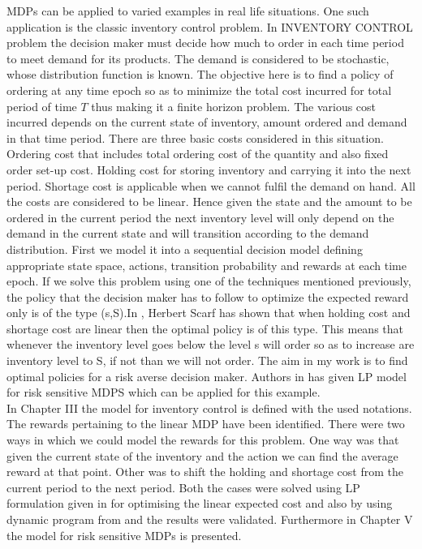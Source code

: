\documentclass[12pt,a4paper,oneside]{report}
\begin{document}
\noindent MDPs can be applied to varied examples in real life situations. One such application is the classic inventory control problem. In INVENTORY CONTROL problem the decision maker must decide how much to order in each time period to meet demand for its products. The demand  is considered to be stochastic, whose distribution function is known. The objective here is to find a policy of ordering at any time epoch so as to minimize the total cost incurred for total period of time $T$ thus making it a finite horizon problem. The various cost incurred depends on the current state of inventory, amount ordered and demand in that time period. There are three basic costs considered in this situation. Ordering cost that includes total  ordering cost of the quantity and also fixed order set-up cost. Holding cost for storing inventory and carrying it into the next period. Shortage cost is applicable when we cannot fulfil the demand on hand. All the costs are considered to be linear. Hence given the state and the amount to be ordered in the current period the next inventory level will only depend on the demand in the current state and will transition according to the demand distribution.  First we model it into a sequential decision model defining appropriate state space, actions, transition probability and rewards at each time epoch.  If we solve this problem using one of the techniques mentioned previously, the policy that the decision maker has to follow to optimize the expected reward only  is of the type (s,S).In \cite{scarf1959optimality}, Herbert Scarf has shown that when holding cost and shortage cost are linear then the optimal policy is of this type. This means that whenever the inventory level goes below the level s will order so as to increase are inventory level to S, if not than we will not order.  The aim in my work is to find optimal policies for a risk averse decision maker. Authors in \citep{kumar2015finite} has given LP model for risk sensitive MDPS which can be applied for this example. \\

In Chapter III the model for inventory control is defined with the used notations. The rewards pertaining to the linear MDP have been identified. There were two ways in which we could model the rewards for this problem. One way was that given the current state of the inventory and the action we can find the average reward at that point. Other was to shift the holding and shortage cost from the current period to the next period. Both the cases were solved using LP formulation given in \citep{kumar2015finite} for optimising the linear expected cost and also by using dynamic program from \citep{puterman1990market} and the results were validated. Furthermore in Chapter V the model for risk sensitive MDPs is presented.
\end{document}
